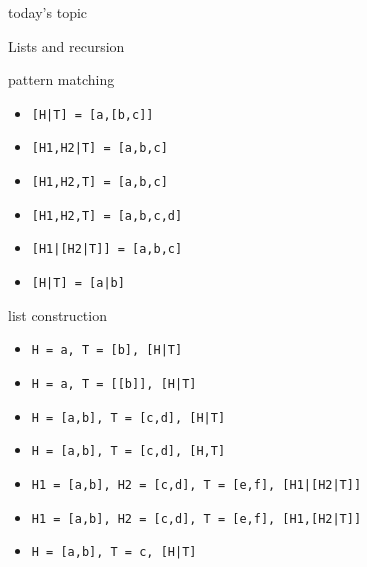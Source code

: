 \begin{frame}{today's topic}

\vspace{60pt}\hspace{80pt}Lists and recursion

\end{frame}

\begin{frame}{pattern matching}
\begin{itemize}
\pause \item  {\tt [H|T] = [a,[b,c]]}  
\pause \item  {\tt [H1,H2|T] = [a,b,c]} 
\pause \item  {\tt [H1,H2,T] = [a,b,c]} 
\pause \item  {\tt [H1,H2,T] = [a,b,c,d]} 
\pause \item  {\tt [H1|[H2|T]] = [a,b,c]}
\pause \item  {\tt [H|T] = [a|b]}
\end{itemize}
\end{frame}

\begin{frame}{list construction}
\begin{itemize}
\pause \item  {\tt H = a, T = [b], [H|T]}
\pause \item  {\tt H = a, T = [[b]], [H|T]}
\pause \item  {\tt H = [a,b], T = [c,d], [H|T]}
\pause \item  {\tt H = [a,b], T = [c,d], [H,T]}
\pause \item  {\tt H1 = [a,b], H2 = [c,d], T = [e,f], [H1|[H2|T]]}
\pause \item  {\tt H1 = [a,b], H2 = [c,d], T = [e,f], [H1,[H2|T]]}
\pause \item  {\tt H = [a,b], T = c, [H|T]}
\end{itemize}
\end{frame}



